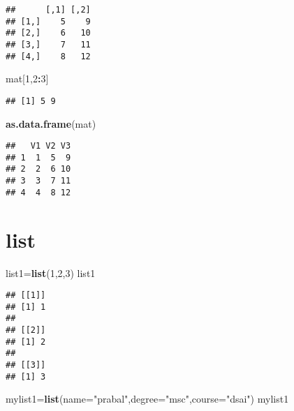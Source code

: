 \documentclass[
]{article}
\newenvironment{Shaded}{\begin{snugshade}}{\end{snugshade}}
\newcommand{\AttributeTok}[1]{\textcolor[rgb]{0.13,0.29,0.53}{#1}}
\newcommand{\DecValTok}[1]{\textcolor[rgb]{0.00,0.00,0.81}{#1}}
\newcommand{\FunctionTok}[1]{\textcolor[rgb]{0.13,0.29,0.53}{\textbf{#1}}}
\newcommand{\NormalTok}[1]{#1}
\newcommand{\OtherTok}[1]{\textcolor[rgb]{0.56,0.35,0.01}{#1}}
\newcommand{\SpecialCharTok}[1]{\textcolor[rgb]{0.81,0.36,0.00}{\textbf{#1}}}
\newcommand{\StringTok}[1]{\textcolor[rgb]{0.31,0.60,0.02}{#1}}
\begin{document}
\begin{verbatim}
##      [,1] [,2]
## [1,]    5    9
## [2,]    6   10
## [3,]    7   11
## [4,]    8   12
\end{verbatim}

\begin{Shaded}
\begin{Highlighting}[]
\NormalTok{mat[}\DecValTok{1}\NormalTok{,}\DecValTok{2}\SpecialCharTok{:}\DecValTok{3}\NormalTok{]}
\end{Highlighting}
\end{Shaded}

\begin{verbatim}
## [1] 5 9
\end{verbatim}

\begin{Shaded}
\begin{Highlighting}[]
\FunctionTok{as.data.frame}\NormalTok{(mat)}
\end{Highlighting}
\end{Shaded}

\begin{verbatim}
##   V1 V2 V3
## 1  1  5  9
## 2  2  6 10
## 3  3  7 11
## 4  4  8 12
\end{verbatim}

\hypertarget{list}{%
\section{list}\label{list}}

\begin{Shaded}
\begin{Highlighting}[]
\NormalTok{list1}\OtherTok{=}\FunctionTok{list}\NormalTok{(}\DecValTok{1}\NormalTok{,}\DecValTok{2}\NormalTok{,}\DecValTok{3}\NormalTok{)}
\NormalTok{list1}
\end{Highlighting}
\end{Shaded}

\begin{verbatim}
## [[1]]
## [1] 1
## 
## [[2]]
## [1] 2
## 
## [[3]]
## [1] 3
\end{verbatim}

\begin{Shaded}
\begin{Highlighting}[]
\NormalTok{mylist1}\OtherTok{=}\FunctionTok{list}\NormalTok{(}\AttributeTok{name=}\StringTok{"prabal"}\NormalTok{,}\AttributeTok{degree=}\StringTok{"msc"}\NormalTok{,}\AttributeTok{course=}\StringTok{"dsai"}\NormalTok{)}
\NormalTok{mylist1}
\end{Highlighting}
\end{Shaded}
\end{document}
